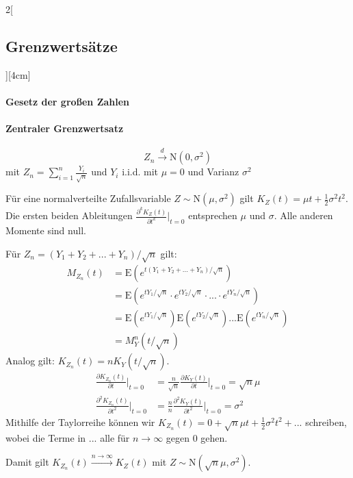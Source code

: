 \documentclass[8pt]{extarticle}
\begin{document}
\begin{multicols}{2}[\subsection{Grenzwertsätze}][4cm]

  \paragraph{Gesetz der großen Zahlen}
  
  \paragraph{Zentraler Grenzwertsatz}
  
  $$Z_n \overset{d}{\longrightarrow} \mathrm{N}(0, \sigma^2)$$
  mit  $Z_n = \sum_{i=1}^{n} \frac{Y_i}{\sqrt{n}}$ und $Y_i$ i.i.d. mit $\mu=0$ und Varianz $\sigma^2$
\begin{Beweis}
Für eine normalverteilte Zufallsvariable $Z \sim \mathrm{N}(\mu, \sigma^2)$ gilt $K_Z(t)=\mu t + \frac{1}{2}\sigma^2t^2$. Die ersten beiden Ableitungen $\frac{\partial^kK_Z(t)}{\partial t^k} \bigg|_{t = 0}$ entsprechen $\mu$ und $\sigma$. Alle anderen Momente sind null. 

\noindent Für $Z_n = (Y_1 + Y_2 + ... +Y_n)/\sqrt{n}$ gilt:
\begin{align*}
M_{Z_n}(t) &= \mathrm{E}\left(e^{t(Y_1 + Y_2 + ... +Y_n)/\sqrt{n}}\right)\\
&= \mathrm{E}\left(e^{tY_1/\sqrt{n}} \cdot e^{tY_2/\sqrt{n}}\cdot ... \cdot e^{tY_n/\sqrt{n}}\right) \\
&= \mathrm{E}\left(e^{tY_1/\sqrt{n}}\right) \mathrm{E}\left(e^{tY_2/\sqrt{n}}\right) ... \mathrm{E}\left(e^{tY_n/\sqrt{n}}\right) \\
&= M_Y^n(t/\sqrt{n})
\end{align*}
Analog gilt: $K_{Z_n}(t) = nK_Y(t/\sqrt{n})$.
\begin{align*}
 \frac{\partial K_{Z_n}(t)}{\partial t} \bigg|_{t = 0} &= \frac{n}{\sqrt{n}} \frac{\partial K_Y(t)}{\partial t} \bigg|_{t = 0} = \sqrt{n}\mu \\
 \frac{\partial^2K_{Z_n}(t)}{\partial t^2} \bigg|_{t = 0} &= \frac{n}{n} \frac{\partial^2 K_Y(t)}{\partial t^2} \bigg|_{t = 0} = \sigma^2
\end{align*}
Mithilfe der Taylorreihe können wir $K_{Z_n}(t) = 0 + \sqrt{n}\mu t + \frac{1}{2}\sigma^2t^2 + ...$ schreiben, wobei die Terme in $...$ alle für $n \rightarrow \infty$ gegen 0 gehen.

\noindent Damit gilt $K_{Z_n}(t) \overset{n\rightarrow\infty}{\longrightarrow} K_{Z}(t)$ mit $Z \sim \mathrm{N}(\sqrt{n}\mu,\sigma^2)$.
\end{Beweis}

\end{multicols}
\end{document}
